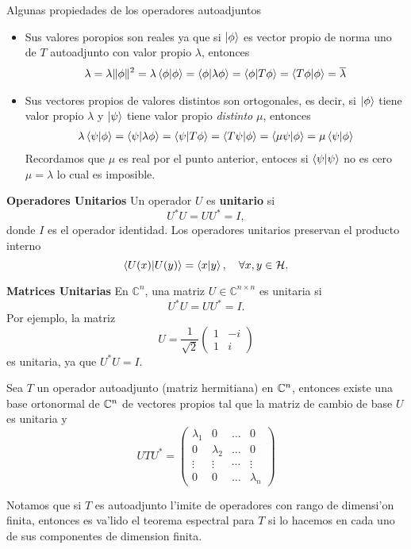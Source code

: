\documentclass[main.tex]{subfiles}
\begin{document}
Algunas propiedades de los operadores autoadjuntos
\begin{itemize}
  \item Sus valores poropios son reales ya que si \(\ket{\phi}\) es vector propio de norma uno de $T$ autoadjunto con valor propio \(\lambda\), entonces
        \begin{align*}
        \lambda=\lambda\|\phi\|^{2}=\lambda\braket{\phi|\phi}=\braket{\phi|\lambda\phi}=\braket{\phi|T\phi}=\braket{T\phi|\phi}=\overline{\lambda}
        \end{align*}
  \item Sus vectores propios de valores distintos son ortogonales, es decir, si $\ket{\phi}$ tiene valor propio $\lambda$ y $\ket{\psi}$ tiene valor propio \emph{distinto} $\mu$, entonces
        \begin{align*}
        \lambda\braket{\psi|\phi}=\braket{\psi|\lambda\phi}=\braket{\psi|T\phi}=\braket{T\psi|\phi}=\braket{\mu\psi|\phi}=\mu\braket{\psi|\phi}
        \end{align*}
        Recordamos que $\mu$ es real por el punto anterior, entoces si $\braket{\psi|\psi}$ no es cero $\mu=\lambda$ lo cual es imposible.
\end{itemize}
\eje\textbf{Operadores Unitarios}
Un operador $U$ es \textbf{unitario} si
\[
U^* U = U U^* = I,
\]
donde $I$ es el operador identidad. Los operadores unitarios preservan el producto interno
\[
\braket{ U(x)| U(y)} = \braket{ x | y}, \quad \forall x, y \in \mathcal{H}.
\]

\eje\textbf{Matrices Unitarias}
En $\mathbb{C}^n$, una matriz $U \in \mathbb{C}^{n \times n}$ es unitaria si
\[
U^* U = U U^* = I.
\]
Por ejemplo, la matriz
\[
U = \frac{1}{\sqrt{2}} \begin{pmatrix}
1 & -i \\
1 & i
\end{pmatrix}
\]
es unitaria, ya que $U^* U = I$.
\begin{teorema}
Sea \(T\) un operador autoadjunto (matriz hermitiana) en $\mathbb{C}^n$, entonces existe una base ortonormal de \(\mathbb{C}^n\) de vectores propios tal que la matriz de cambio de base \(U\) es unitaria y
\[
UTU^{*}= \begin{pmatrix}\lambda_{1}& 0 & \dots & 0\\ 0 & \lambda_{2} & \dots & 0\\ \vdots & \vdots & \cdots & \vdots\\ 0 & 0 & \dots & \lambda_{n} \end{pmatrix}
\]
\end{teorema}
\obs Notamos que si $T$ es autoadjunto l'imite de operadores con rango de dimensi'on finita, entonces es va'lido  el teorema espectral para $T$ si lo hacemos en cada uno de sus componentes de dimension finita.
\end{document}

